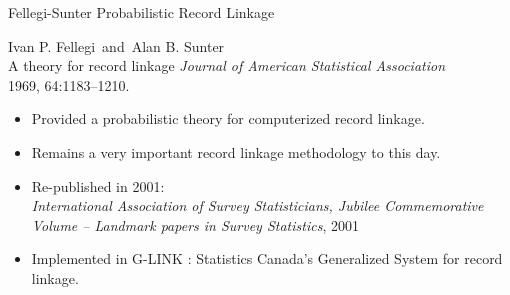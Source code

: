 
\begin{frame}{\vskip -0.2cm \Large Fellegi-Sunter Probabilistic Record Linkage}

\pause


\Large
\begin{center}
\vskip -0.035cm
Ivan P. Fellegi \,and\, Alan B. Sunter\\
A theory for record linkage
\vskip 0.15cm
\small
\textit{Journal of American Statistical Association}\\
1969, 64:1183--1210.
\end{center}

\vskip 0.2cm

\footnotesize
\begin{itemize}
\pause\item
	Provided a probabilistic theory for computerized record linkage.
\pause\item
	Remains a very important record linkage methodology to this day.
\pause\item
	Re-published in 2001:\\
	\textit{International Association of Survey Statisticians, Jubilee Commemorative Volume
	-- Landmark papers in Survey Statistics}, 2001
\pause\item
	Implemented in G-LINK : Statistics Canada's Generalized System for record linkage.
\end{itemize}

\end{frame}
\normalsize


